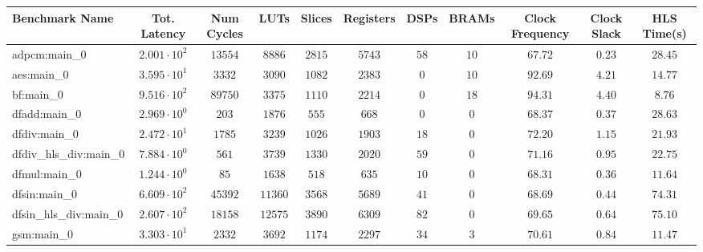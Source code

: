 \begin{tabular}{|l|c|c|c|c|c|c|c|c|c|c|}
\hline
Benchmark Name          & Tot. Latency           & Num Cycles & LUTs      & Slices    & Registers & DSPs    & BRAMs   & Clock Frequency & Clock Slack & HLS Time(s) \\
\hline
adpcm:main\_0           & $ 2.001 \cdot 10^{2} $ & $ 13554  $ & $ 8886  $ & $ 2815  $ & $ 5743  $ & $ 58  $ & $ 10  $ & $ 67.72       $ & $ 0.23    $ & $ 28.45   $ \\
aes:main\_0             & $ 3.595 \cdot 10^{1} $ & $ 3332   $ & $ 3090  $ & $ 1082  $ & $ 2383  $ & $ 0   $ & $ 10  $ & $ 92.69       $ & $ 4.21    $ & $ 14.77   $ \\
bf:main\_0              & $ 9.516 \cdot 10^{2} $ & $ 89750  $ & $ 3375  $ & $ 1110  $ & $ 2214  $ & $ 0   $ & $ 18  $ & $ 94.31       $ & $ 4.40    $ & $ 8.76    $ \\
dfadd:main\_0           & $ 2.969 \cdot 10^{0} $ & $ 203    $ & $ 1876  $ & $ 555   $ & $ 668   $ & $ 0   $ & $ 0   $ & $ 68.37       $ & $ 0.37    $ & $ 28.63   $ \\
dfdiv:main\_0           & $ 2.472 \cdot 10^{1} $ & $ 1785   $ & $ 3239  $ & $ 1026  $ & $ 1903  $ & $ 18  $ & $ 0   $ & $ 72.20       $ & $ 1.15    $ & $ 21.93   $ \\
dfdiv\_hls\_div:main\_0 & $ 7.884 \cdot 10^{0} $ & $ 561    $ & $ 3739  $ & $ 1330  $ & $ 2020  $ & $ 59  $ & $ 0   $ & $ 71.16       $ & $ 0.95    $ & $ 22.75   $ \\
dfmul:main\_0           & $ 1.244 \cdot 10^{0} $ & $ 85     $ & $ 1638  $ & $ 518   $ & $ 635   $ & $ 10  $ & $ 0   $ & $ 68.31       $ & $ 0.36    $ & $ 11.64   $ \\
dfsin:main\_0           & $ 6.609 \cdot 10^{2} $ & $ 45392  $ & $ 11360 $ & $ 3568  $ & $ 5689  $ & $ 41  $ & $ 0   $ & $ 68.69       $ & $ 0.44    $ & $ 74.31   $ \\
dfsin\_hls\_div:main\_0 & $ 2.607 \cdot 10^{2} $ & $ 18158  $ & $ 12575 $ & $ 3890  $ & $ 6309  $ & $ 82  $ & $ 0   $ & $ 69.65       $ & $ 0.64    $ & $ 75.10   $ \\
gsm:main\_0             & $ 3.303 \cdot 10^{1} $ & $ 2332   $ & $ 3692  $ & $ 1174  $ & $ 2297  $ & $ 34  $ & $ 3   $ & $ 70.61       $ & $ 0.84    $ & $ 11.47   $ \\

\end{tabular}
